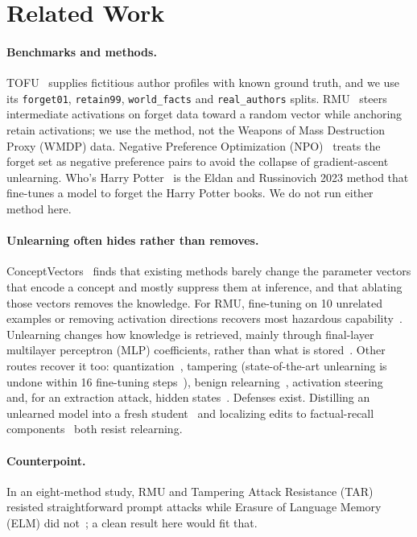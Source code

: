 \documentclass[10pt,twocolumn]{article}
\newcommand{\code}[1]{\texttt{#1}}
\begin{document}
\section{Related Work}
\label{sec:related}
\paragraph{Benchmarks and methods.} TOFU~\cite{maini2024tofu} supplies fictitious author profiles with known ground truth, and we use its \code{forget01}, \code{retain99}, \code{world\_facts} and \code{real\_authors} splits. RMU~\cite{li2024wmdp} steers intermediate activations on forget data toward a random vector while anchoring retain activations; we use the method, not the Weapons of Mass Destruction Proxy (WMDP) data. Negative Preference Optimization (NPO)~\cite{zhang2024npo} treats the forget set as negative preference pairs to avoid the collapse of gradient-ascent unlearning. Who's Harry Potter~\cite{eldan2023harry} is the Eldan and Russinovich 2023 method that fine-tunes a model to forget the Harry Potter books. We do not run either method here.

\paragraph{Unlearning often hides rather than removes.} ConceptVectors~\cite{hong2024conceptvectors} finds that existing methods barely change the parameter vectors that encode a concept and mostly suppress them at inference, and that ablating those vectors removes the knowledge. For RMU, fine-tuning on 10 unrelated examples or removing activation directions recovers most hazardous capability~\cite{lucki2024adversarial}. Unlearning changes how knowledge is retrieved, mainly through final-layer multilayer perceptron (MLP) coefficients, rather than what is stored~\cite{hong2024dissecting}. Other routes recover it too: quantization~\cite{zhang2024quantization}, tampering (state-of-the-art unlearning is undone within 16 fine-tuning steps~\cite{che2025tampering}), benign relearning~\cite{hu2024jogging}, activation steering~\cite{seyitoglu2024extracting} and, for an extraction attack, hidden states~\cite{patil2023sensitive}. Defenses exist. Distilling an unlearned model into a fresh student~\cite{lee2025distillation} and localizing edits to factual-recall components~\cite{guo2024mechanistic} both resist relearning.

\paragraph{Counterpoint.} In an eight-method study, RMU and Tampering Attack Resistance (TAR) resisted straightforward prompt attacks while Erasure of Language Memory (ELM) did not~\cite{jang2025prompt}; a clean result here would fit that.
\end{document}
